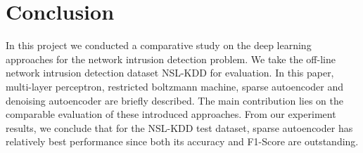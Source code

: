 \section{Conclusion}
In this project we conducted a comparative study on the deep learning approaches
for the network intrusion detection problem.
We take the off-line network intrusion detection dataset NSL-KDD for evaluation.
In this paper, multi-layer perceptron, restricted boltzmann machine, sparse autoencoder
and denoising autoencoder are briefly described.
The main contribution lies on the comparable evaluation of these introduced approaches.
From our experiment results, we conclude that for the NSL-KDD test dataset,
sparse autoencoder has relatively best performance since both its accuracy and F1-Score
are outstanding.
